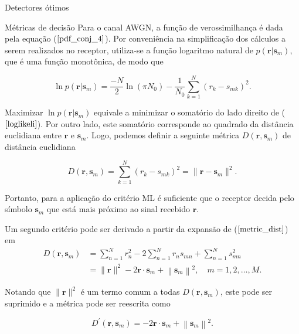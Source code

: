 \documentclass[
  ignorenonframetext,
]{beamer}
\begin{document}
\begin{frame}{Detectores ótimos}
\begin{block}{Métricas de decisão}
\label{muxe9tricas-de-decisuxe3o}
Para o canal AWGN, a função de verossimilhança é dada pela equação
(\(\ref{pdf_conj_4}\)). Por conveniência na simplificação dos cálculos a
serem realizados no receptor, utiliza-se a função logaritmo natural de
\(p\left(\mathbf{r}|\mathbf{s}_m\right)\), que é uma função monotônica,
de modo que

\begin{equation}\label{loglikeli}
\ln p\left(\mathbf{r}|\mathbf{s}_m\right)=\frac{-N}{2} \ln \left(\pi N_0\right)-\frac{1}{N_0} \sum_{k=1}^N\left(r_k-s_{m k}\right)^2.
\end{equation}

Maximizar \(\ln p\left(\mathbf{r}|\mathbf{s}_m\right)\) equivale a
minimizar o somatório do lado direito de (\(\ref{loglikeli}\)). Por
outro lado, este somatório corresponde ao quadrado da distância
euclidiana entre \(\mathbf{r}\) e \(\mathbf{s}_m\). Logo, podemos
definir a seguinte métrica \(D\left(\mathbf{r}, \mathbf{s}_m\right)\) de
distância euclidiana

\begin{equation}\label{metric_dist}
D\left(\mathbf{r}, \mathbf{s}_m\right)=\sum_{k=1}^N\left(r_k-s_{m k}\right)^2 = \| \mathbf{r} - \mathbf{s}_m \|^2.
\end{equation}

Portanto, para a aplicação do critério ML é suficiente que o receptor
decida pelo símbolo \(\mathbf{s}_m\) que está mais próximo ao sinal
recebido \(\mathbf{r}\).

Um segundo critério pode ser derivado a partir da expansão de
(\(\ref{metric_dist}\)) em \[
\begin{align}
D\left(\mathbf{r}, \mathbf{s}_m\right) & =\sum_{n=1}^N r_n^2-2 \sum_{n=1}^N r_n s_{m n}+\sum_{n=1}^N s_{m n}^2 \nonumber \\
&=\|\mathbf{r}\|^2-2 \mathbf{r} \cdot \mathbf{s}_m+\left\|\mathbf{s}_m\right\|^2, \quad m=1,2, \ldots, M.
\end{align}
\]

Notando que \(\|\mathbf{r}\|^2\) é um termo comum a todas
\(D\left(\mathbf{r}, \mathbf{s}_m\right)\), este pode ser suprimido e a
métrica pode ser reescrita como

\begin{equation}\label{metric_dist2}
D^{\prime}\left(\mathbf{r}, \mathbf{s}_m\right)=-2 \mathbf{r} \cdot \mathbf{s}_m+\left\|\mathbf{s}_m\right\|^2.
\end{equation}


\end{block}
\end{frame}
\end{document}
